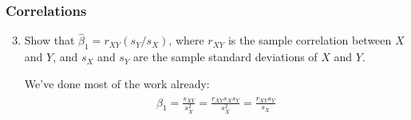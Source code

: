 \begin{frame}
\frametitle{Correlations}

\begin{enumerate}\setcounter{enumi}{2}

\item Show that $\hat{\beta}_1=r_{XY}(s_{Y}/s_{X})$, where $r_{XY}$ is the sample correlation between $X$ and $Y$, and $s_X$ and $s_Y$ are the sample standard deviations of $X$ and $Y$.

\begin{answer}
We've done most of the work already:
\begin{align*}
\hat{\beta}_{1}
    = \frac{s_{XY}}{s_{X}^2}
    = \frac{r_{XY} s_{X} s_{Y}}{s_{X}^2}
    = \frac{r_{XY} s_{Y}}{s_{X}}
\end{align*}
\end{answer}

\end{enumerate}
\end{frame}


